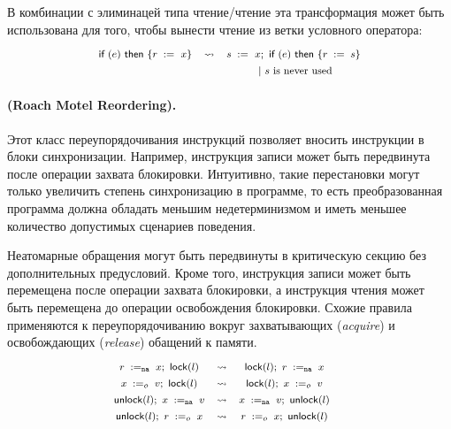 В комбинации с элиминацей типа чтение/чтение 
эта трансформация может быть использована 
для того, чтобы вынести чтение из 
ветки условного оператора:
%
\[\def\arraystretch{1.4}\footnotesize
  \begin{array}{ccc} 

      \kw{if} (e)~ \kw{then} \{ \readInst{}{r}{x} \}
    & \leadsto 
    & \readInst{}{s}{x} \seq \kw{if} (e)~ \kw{then} \{ \assignInst{r}{s} \} \\
    & & ~|~ \text{$s$ is never used}  \\ 

  \end{array}
\]

\paragraph{
(Roach Motel Reordering).
}

Этот класс переупорядочивания инструкций позволяет вносить инструкции в блоки синхронизации. 
Например, инструкция записи может быть передвинута после операции захвата блокировки. 
Интуитивно, такие перестановки могут 
только увеличить степень синхронизацию в программе, 
то есть преобразованная программа 
должна обладать меньшим недетерминизмом 
и иметь меньшее количество допустимых сценариев поведения. 

Неатомарные обращения могут быть передвинуты 
в критическую секцию без дополнительных предусловий. 
Кроме того, инструкция записи может быть перемещена после 
операции захвата блокировки, а инструкция чтения 
может быть перемещена до операции освобождения блокировки. 
Схожие правила применяются к переупорядочиванию вокруг 
захватывающих (\emph{acquire}) и освобождающих (\emph{release}) 
обащений к памяти. 
\[\def\arraystretch{1.4}\footnotesize
  \begin{array}{cccl} 

      \readInst{\na}{r}{x} \seq \lockInst{l} 
    & \leadsto 
    & \lockInst{l} \seq \readInst{\na}{r}{x}
    & ~ \\ 

      \writeInst{o}{x}{v} \seq \lockInst{l} 
    & \leadsto 
    & \lockInst{l} \seq \writeInst{o}{x}{v}
    & ~  \\ 

      \unlockInst{l} \seq \writeInst{\na}{x}{v} 
    & \leadsto 
    & \writeInst{\na}{x}{v} \seq \unlockInst{l}
    & ~ \\ 


      \unlockInst{l} \seq \readInst{o}{r}{x} 
    & \leadsto 
    & \readInst{o}{r}{x} \seq \unlockInst{l}
    & ~  \\ 

  \end{array}
\]


